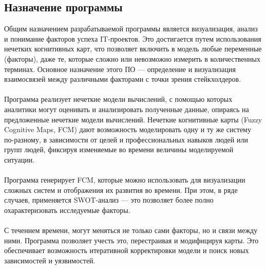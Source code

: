 \documentclass{article}
\begin{document}
    \subsection {Назначение программы}
    Общим назначением разрабатываемой программы является визуализация, анализ и понимание факторов успеха IT-проектов. Это достигается путем использования нечетких когнитивных карт, что позволяет включить в модель любые переменные (факторы), даже те, которые сложно или невозможно измерить в количественных терминах. Основное назначение этого ПО — определение и визуализация взаимосвязей между различными факторами с точки зрения стейкхолдеров.\\
    ~\\
    Программа реализует нечеткие модели вычислений, с помощью которых аналитики могут оценивать и анализировать полученные данные, опираясь на предложенные нечеткие модели вычислений. Нечеткие когнитивные карты (Fuzzy Cognitive Maps, FCM) дают возможность моделировать одну и ту же систему по-разному, в зависимости от целей и профессиональных навыков людей или групп людей, фиксируя изменяемые во времени величины моделируемой ситуации.\\
    ~\\
    Программа генерирует FCM, которые можно использовать для визуализации сложных систем и отображения их развития во времени. При этом, в ряде случаев, применяется SWOT-анализ — это позволяет более полно охарактеризовать исследуемые факторы.\\
    ~\\
    С течением времени, могут меняться не только сами факторы, но и связи между ними. Программа позволяет учесть это, перестраивая и модифицируя карты. Это обеспечивает возможность итеративной корректировки модели и поиск новых зависимостей и уязвимостей.\\
\end{document}
